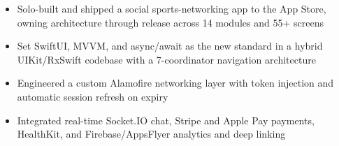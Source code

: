 \begin{itemize}
    \item Solo-built and shipped a social sports-networking app to the App Store, owning architecture through release across 14 modules and 55+ screens
    \item Set SwiftUI, MVVM, and async/await as the new standard in a hybrid UIKit/RxSwift codebase with a 7-coordinator navigation architecture
    \item Engineered a custom Alamofire networking layer with token injection and automatic session refresh on expiry
    \item Integrated real-time Socket.IO chat, Stripe and Apple Pay payments, HealthKit, and Firebase/AppsFlyer analytics and deep linking
\end{itemize}
